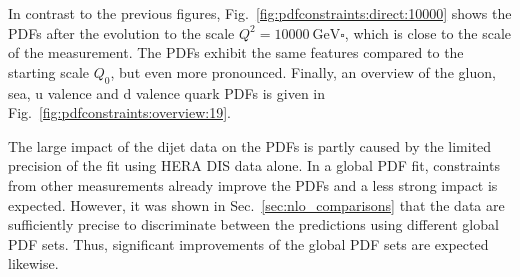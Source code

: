 In contrast to the previous figures, Fig.~\ref{fig:pdfconstraints:direct:10000}
shows the PDFs after the evolution to the scale $Q^2 = \SI{10000}{\GeV
\square}$, which is close to the scale of the measurement. The PDFs exhibit the same
features compared to the starting scale $Q_0$, but even more pronounced.
Finally, an overview of the gluon, sea, u valence and d valence quark PDFs is
given in Fig.~\ref{fig:pdfconstraints:overview:19}. 

The large impact of the dijet data on the PDFs is partly caused by the limited
precision of the fit using HERA DIS data alone. In a global PDF fit, constraints
from other measurements already improve the PDFs and a less strong
impact is expected. However, it was shown in Sec.~\ref{sec:nlo_comparisons} that
the data are sufficiently precise to discriminate between the predictions using
different global PDF sets. Thus, significant improvements of the global
PDF sets are expected likewise.

